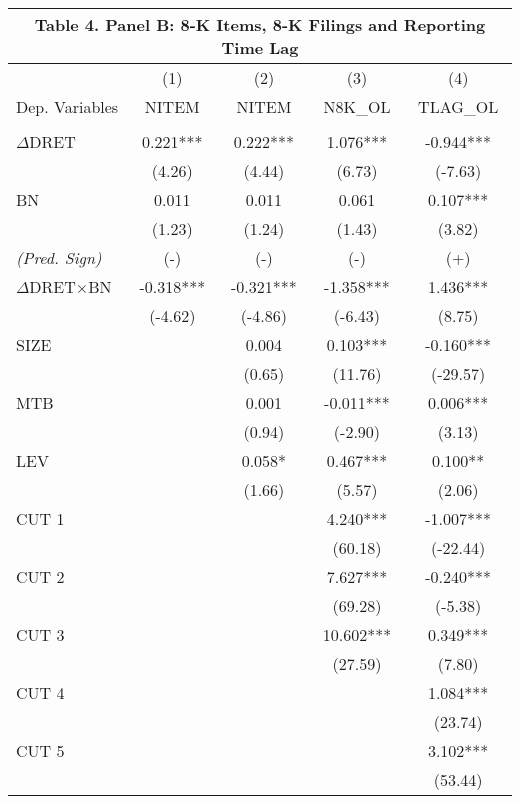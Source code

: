 \begin{table}[H] \label{T4PB}%
	\begin{center}
		\begin{tabular}{lcccc}
			\multicolumn{5}{c}{\textbf{Table 4. Panel B: 8-K Items, 8-K Filings and Reporting Time Lag}} \\
			\midrule
			\midrule
			& (1) & (2) & (3) & (4) \\
			Dep. Variables & NITEM & NITEM & N8K\_OL & TLAG\_OL \\
			\midrule
			&   &   &   &  \\
			$\Delta$DRET & 0.221*** & 0.222*** & 1.076*** & -0.944*** \\
			& (4.26) & (4.44) & (6.73) & (-7.63) \\
			BN & 0.011 & 0.011 & 0.061 & 0.107*** \\
			& (1.23) & (1.24) & (1.43) & (3.82) \\
			\rowcolor[rgb]{ .933,  .925,  .882} \textit{(Pred. Sign)} & (-) & (-) & (-) & (+) \\
			\rowcolor[rgb]{ .933,  .925,  .882} $\Delta$DRET$\times$BN & -0.318*** & -0.321*** & -1.358*** & 1.436*** \\
			\rowcolor[rgb]{ .933,  .925,  .882}   & (-4.62) & (-4.86) & (-6.43) & (8.75) \\
			SIZE &   & 0.004 & 0.103*** & -0.160*** \\
			&   & (0.65) & (11.76) & (-29.57) \\
			MTB &   & 0.001 & -0.011*** & 0.006*** \\
			&   & (0.94) & (-2.90) & (3.13) \\
			LEV &   & 0.058* & 0.467*** & 0.100** \\
			&   & (1.66) & (5.57) & (2.06) \\
			CUT 1 &   &   & 4.240*** & -1.007*** \\
			&   &   & (60.18) & (-22.44) \\
			CUT 2 &   &   & 7.627*** & -0.240*** \\
			&   &   & (69.28) & (-5.38) \\
			CUT 3 &   &   & 10.602*** & 0.349*** \\
			&   &   & (27.59) & (7.80) \\
			CUT 4 &   &   &   & 1.084*** \\
			&   &   &   & (23.74) \\
			CUT 5 &   &   &   & 3.102*** \\
			&   &   &   & (53.44) \\

\end{tabular}
\end{center}
\end{table}

